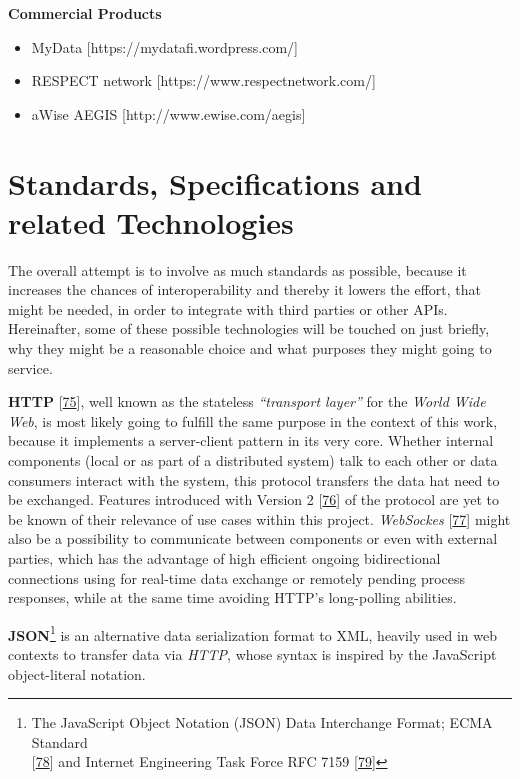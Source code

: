 \documentclass[12pt,english,a4paper,titlepage,cleardoublepage=empty,dottedtoc]{report}
\providecommand{\tightlist}{%
  \setlength{\itemsep}{0pt}\setlength{\parskip}{0pt}}
\begin{document}
\textbf{Commercial Products}

\begin{itemize}
\tightlist
\item
  MyData {[}https://mydatafi.wordpress.com/{]}
\item
  RESPECT network {[}https://www.respectnetwork.com/{]}
\item
  aWise AEGIS {[}http://www.ewise.com/aegis{]}
\end{itemize}

\hypertarget{standards-specifications-and-related-technologies}{\section{Standards,
Specifications and related
Technologies}\label{standards-specifications-and-related-technologies}}

The overall attempt is to involve as much standards as possible, because
it increases the chances of interoperability and thereby it lowers the
effort, that might be needed, in order to integrate with third parties
or other APIs. Hereinafter, some of these possible technologies will be
touched on just briefly, why they might be a reasonable choice and what
purposes they might going to service.

\textbf{\protect\hypertarget{link_http}{}{HTTP}}
{[}\protect\hyperlink{ref-web_spec_http1}{75}{]}, well known as the
stateless \emph{``transport layer''} for the \emph{World Wide Web}, is
most likely going to fulfill the same purpose in the context of this
work, because it implements a server-client pattern in its very core.
Whether internal components (local or as part of a distributed system)
talk to each other or data consumers interact with the system, this
protocol transfers the data hat need to be exchanged. Features
introduced with Version 2
{[}\protect\hyperlink{ref-web_spec_http2}{76}{]} of the protocol are yet
to be known of their relevance of use cases within this project.
\emph{WebSockes} {[}\protect\hyperlink{ref-web_spec_websockets}{77}{]}
might also be a possibility to communicate between components or even
with external parties, which has the advantage of high efficient ongoing
bidirectional connections using for real-time data exchange or remotely
pending process responses, while at the same time avoiding HTTP's
long-polling abilities.

\textbf{JSON}\footnote{The JavaScript Object Notation (JSON) Data
  Interchange Format; ECMA Standard\\
  {[}\protect\hyperlink{ref-web_spec_json}{78}{]} and Internet
  Engineering Task Force RFC 7159
  {[}\protect\hyperlink{ref-web_rfc_json}{79}{]}} is an alternative data
serialization format to XML, heavily used in web contexts to transfer
data via \emph{HTTP}, whose syntax is inspired by the JavaScript
object-literal notation.
\end{document}

